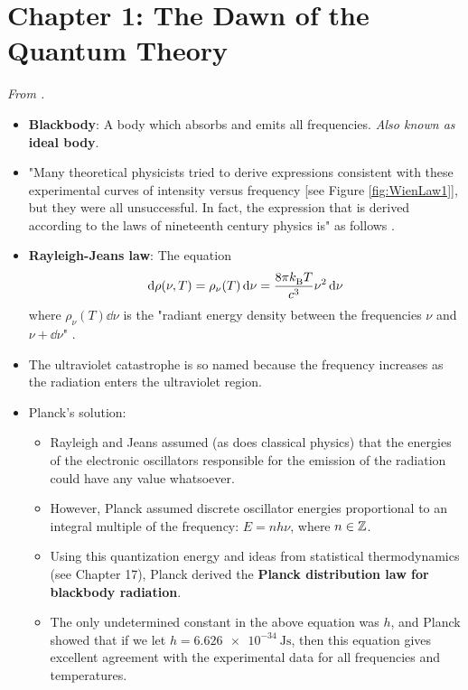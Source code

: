 \documentclass[../notes.tex]{subfiles}
\begin{document}
\section{Chapter 1: The Dawn of the Quantum Theory}
\emph{From \textcite{bib:McQuarrieSimon}.}
\begin{itemize}
    \item {}\textbf{Blackbody}: A body which absorbs and emits all frequencies. \emph{Also known as} \textbf{ideal body}.
    \item "Many theoretical physicists tried to derive expressions consistent with these experimental curves of intensity versus frequency [see Figure \ref{fig:WienLaw1}], but they were all unsuccessful. In fact, the expression that is derived according to the laws of nineteenth century physics is" as follows \parencite[3]{bib:McQuarrieSimon}.
    \item \textbf{Rayleigh-Jeans law}: The equation
    \begin{equation*}
        \dd{\rho(\nu,T)} = \rho_\nu(T)\dd{\nu} = \frac{8\pi k_\text{B}^{} T}{c^3}\nu^2\dd{\nu}
    \end{equation*}
    where $\rho_\nu(T)\dd{\nu}$ is the "radiant energy density between the frequencies $\nu$ and $\nu+\dd{\nu}$" \parencite[3]{bib:McQuarrieSimon}.
    \item The ultraviolet catastrophe is so named because the frequency increases as the radiation enters the ultraviolet region.
    \item Planck's solution:
    \begin{itemize}
        \item Rayleigh and Jeans assumed (as does classical physics) that the energies of the electronic oscillators responsible for the emission of the radiation could have any value whatsoever.
        \item However, Planck assumed discrete oscillator energies proportional to an integral multiple of the frequency: $E=nh\nu$, where $n\in\mathbb{Z}$.
        \item Using this quantization energy and ideas from statistical thermodynamics (see Chapter 17), Planck derived the \textbf{Planck distribution law for blackbody radiation}.
        \item The only undetermined constant in the above equation was $h$, and Planck showed that if we let $h=\SI{6.626e-34}{\joule\second}$, then this equation gives excellent agreement with the experimental data for all frequencies and temperatures.
    \end{itemize}

\end{itemize}
\end{document}
